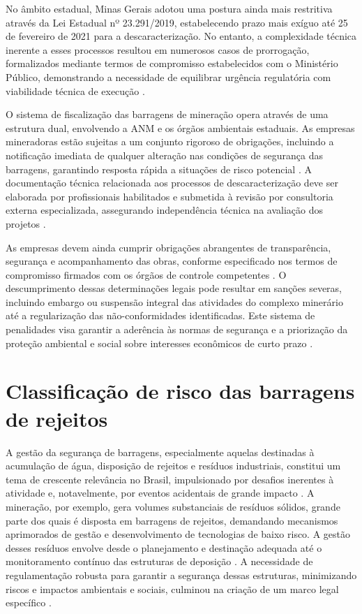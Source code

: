 No âmbito estadual, Minas Gerais adotou uma postura ainda mais restritiva através da Lei Estadual nº 23.291/2019, estabelecendo prazo mais exíguo até 25 de fevereiro de 2021 para a descaracterização. No entanto, a complexidade técnica inerente a esses processos resultou em numerosos casos de prorrogação, formalizados mediante termos de compromisso estabelecidos com o Ministério Público, demonstrando a necessidade de equilibrar urgência regulatória com viabilidade técnica de execução \cite{feam2024}.

O sistema de fiscalização das barragens de mineração opera através de uma estrutura dual, envolvendo a ANM e os órgãos ambientais estaduais. As empresas mineradoras estão sujeitas a um conjunto rigoroso de obrigações, incluindo a notificação imediata de qualquer alteração nas condições de segurança das barragens, garantindo resposta rápida a situações de risco potencial \cite{cbhsf2020}. A documentação técnica relacionada aos processos de descaracterização deve ser elaborada por profissionais habilitados e submetida à revisão por consultoria externa especializada, assegurando independência técnica na avaliação dos projetos \cite{anm2023barragens}.

As empresas devem ainda cumprir obrigações abrangentes de transparência, segurança e acompanhamento das obras, conforme especificado nos termos de compromisso firmados com os órgãos de controle competentes \cite{feam2024}. O descumprimento dessas determinações legais pode resultar em sanções severas, incluindo embargo ou suspensão integral das atividades do complexo minerário até a regularização das não-conformidades identificadas. Este sistema de penalidades visa garantir a aderência às normas de segurança e a priorização da proteção ambiental e social sobre interesses econômicos de curto prazo \cite{anm2023barragens}.

\section{Classificação de risco das barragens de rejeitos}
\label{sec:classificacao_risco}

A gestão da segurança de barragens, especialmente aquelas destinadas à acumulação de água, disposição de rejeitos e resíduos industriais, constitui um tema de crescente relevância no Brasil, impulsionado por desafios inerentes à atividade e, notavelmente, por eventos acidentais de grande impacto \cite{carvalho2018,geoscan2020}. A mineração, por exemplo, gera volumes substanciais de resíduos sólidos, grande parte dos quais é disposta em barragens de rejeitos, demandando mecanismos aprimorados de gestão e desenvolvimento de tecnologias de baixo risco. A gestão desses resíduos envolve desde o planejamento e destinação adequada até o monitoramento contínuo das estruturas de deposição \cite{carvalho2018}. A necessidade de regulamentação robusta para garantir a segurança dessas estruturas, minimizando riscos e impactos ambientais e sociais, culminou na criação de um marco legal específico \cite{cnrh2012,carvalho2018}.

